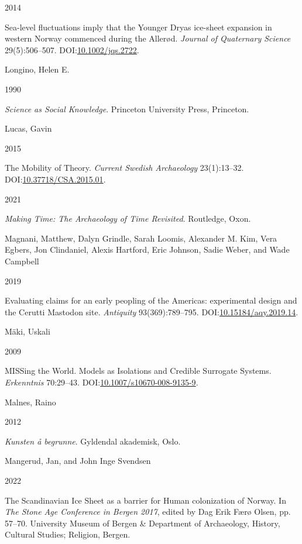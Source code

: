 \documentclass[
  12pt,
  a4paper,
  oneside]{book}
\newlength{\cslhangindent}
\newlength{\csllabelwidth}
\newlength{\cslentryspacingunit} %
\newenvironment{CSLReferences}[2] %
 {%
  \setlength{\parindent}{0pt}
  \ifodd #1
  \let\oldpar\par
  \def\par{\hangindent=\cslhangindent\oldpar}
  \fi
  \setlength{\parskip}{#2\cslentryspacingunit}
 }%
 {}
\newcommand{\CSLBlock}[1]{#1\hfill\break}
\newcommand{\CSLLeftMargin}[1]{\parbox[t]{\csllabelwidth}{#1}}
\newcommand{\CSLRightInline}[1]{\parbox[t]{\linewidth - \csllabelwidth}{#1}\break}
\begin{document}
\begin{CSLReferences}{0}{0}
\leavevmode{}%
\CSLLeftMargin{ 2014 }%
\CSLRightInline{{Sea-level fluctuations imply that the Younger Dryas ice-sheet expansion in western Norway commenced during the Allerød}. \emph{Journal of Quaternary Science} 29(5):506--507. DOI:\href{https://doi.org/10.1002/jqs.2722}{10.1002/jqs.2722}.}

\leavevmode{}%
\CSLBlock{Longino, Helen E.}
\CSLLeftMargin{ 1990}%
\CSLRightInline{\emph{{Science as Social Knowledge}}. Princeton University Press, Princeton.}

\leavevmode{}%
\CSLBlock{Lucas, Gavin}
\CSLLeftMargin{ 2015}%
\CSLRightInline{{The Mobility of Theory}. \emph{Current Swedish Archaeology} 23(1):13--32. DOI:\href{https://doi.org/10.37718/CSA.2015.01}{10.37718/CSA.2015.01}.}

\leavevmode{}%
\CSLLeftMargin{ 2021 }%
\CSLRightInline{\emph{{Making Time: The Archaeology of Time Revisited}}. Routledge, Oxon.}

\leavevmode{}%
\CSLBlock{Magnani, Matthew, Dalyn Grindle, Sarah Loomis, Alexander M. Kim, Vera Egbers, Jon Clindaniel, Alexis Hartford, Eric Johnson, Sadie Weber, and Wade Campbell}
\CSLLeftMargin{ 2019}%
\CSLRightInline{Evaluating claims for an early peopling of the Americas: experimental design and the Cerutti Mastodon site. \emph{Antiquity} 93(369):789--795. DOI:\href{https://doi.org/10.15184/aqy.2019.14}{10.15184/aqy.2019.14}.}

\leavevmode{}%
\CSLBlock{Mäki, Uskali}
\CSLLeftMargin{ 2009}%
\CSLRightInline{{MISSing the World. Models as Isolations and Credible Surrogate Systems}. \emph{Erkenntnis} 70:29--43. DOI:\href{https://doi.org/10.1007/s10670-008-9135-9}{10.1007/s10670-008-9135-9}.}

\leavevmode{}%
\CSLBlock{Malnes, Raino}
\CSLLeftMargin{ 2012}%
\CSLRightInline{\emph{{Kunsten å begrunne}}. Gyldendal akademisk, Oslo.}

\leavevmode{}%
\CSLBlock{Mangerud, Jan, and John Inge Svendsen}
\CSLLeftMargin{ 2022}%
\CSLRightInline{{The Scandinavian Ice Sheet as a barrier for Human colonization of Norway}. In \emph{{The Stone Age Conference in Bergen 2017}}, edited by Dag Erik Færø Olsen, pp. 57--70. University Museum of Bergen \& Department of Archaeology, History, Cultural Studies; Religion, Bergen.}


\end{CSLReferences}
\end{document}

